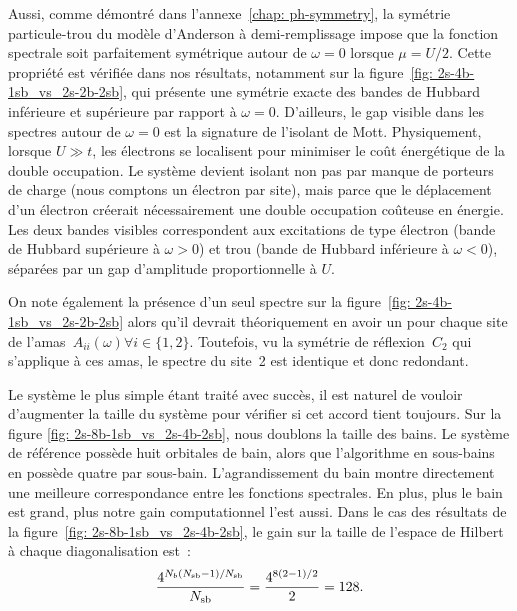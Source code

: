 Aussi, comme démontré dans l'annexe~\ref{chap: ph-symmetry}, la symétrie
particule-trou du modèle d'Anderson à demi-remplissage impose que la fonction
spectrale soit parfaitement symétrique autour de $\omega=0$ lorsque $\mu=U/2$.
Cette propriété est vérifiée dans nos résultats, notamment sur la
figure~\ref{fig: 2s-4b-1sb_vs_2s-2b-2sb}, qui présente une symétrie exacte des
bandes de Hubbard inférieure et supérieure par rapport à $\omega=0$. D'ailleurs,
le gap visible dans les spectres autour de $\omega = 0$ est la signature de
l'isolant de Mott. Physiquement, lorsque $U \gg t$, les électrons se localisent
pour minimiser le coût énergétique de la double occupation. Le système devient
isolant non pas par manque de porteurs de charge (nous comptons un électron par
site), mais parce que le déplacement d’un électron créerait nécessairement une
double occupation coûteuse en énergie. Les deux bandes visibles correspondent
aux excitations de type électron (bande de Hubbard supérieure à $\omega > 0$) et
trou (bande de Hubbard inférieure à $\omega < 0$), séparées par un gap
d'amplitude proportionnelle à $U$.

On note également la présence d'un seul spectre sur la figure~\ref{fig:
2s-4b-1sb_vs_2s-2b-2sb} alors qu'il devrait théoriquement en avoir un pour
chaque site de l'amas~$A_{ii}(\omega)\forall i\in\{1, 2\}$. Toutefois, vu la
symétrie de réflexion~$C_2$ qui s'applique à ces amas, le spectre du site~2 est
identique et donc redondant.

Le système le plus simple étant traité avec succès, il est naturel de vouloir
d'augmenter la taille du système pour vérifier si cet accord tient toujours. Sur
la figure \ref{fig: 2s-8b-1sb_vs_2s-4b-2sb}, nous doublons la taille des bains.
Le système de référence possède huit orbitales de bain, alors que l’algorithme
en sous-bains en possède quatre par sous-bain. L'agrandissement du bain montre
directement une meilleure correspondance entre les fonctions spectrales. En
plus, plus le bain est grand, plus notre gain computationnel l'est aussi. Dans
le cas des résultats de la figure~\ref{fig: 2s-8b-1sb_vs_2s-4b-2sb}, le gain sur
la taille de l'espace de Hilbert à chaque diagonalisation est~:
\begin{align*}
    \frac{4^{N_b(N_{\rm sb}-1)/N_{\rm sb}}}{N_{\rm sb}} = \frac{4^{8(2 -
    1)/2}}{2} = 128.
\end{align*}

\clearpage

